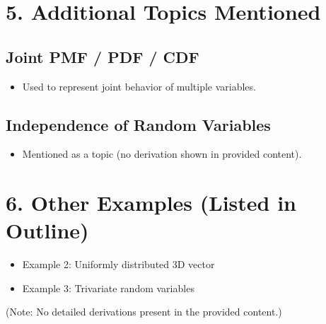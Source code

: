 \documentclass[12pt]{article}
\begin{document}
\section*{5. Additional Topics Mentioned}

\subsection*{Joint PMF / PDF / CDF}

\begin{itemize}
    \item Used to represent joint behavior of multiple variables.
\end{itemize}

\subsection*{Independence of Random Variables}

\begin{itemize}
    \item Mentioned as a topic (no derivation shown in provided content).
\end{itemize}

\section*{6. Other Examples (Listed in Outline)}

\begin{itemize}
    \item Example 2: Uniformly distributed 3D vector
    \item Example 3: Trivariate random variables
\end{itemize}

(Note: No detailed derivations present in the provided content.)
\end{document}
